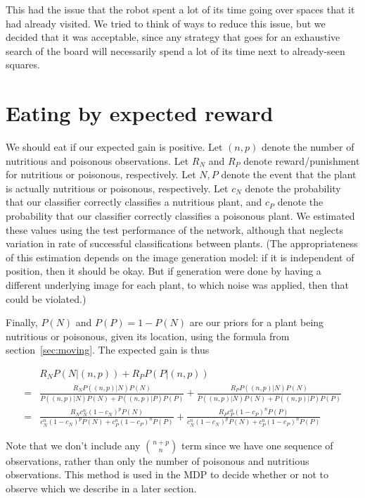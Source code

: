 \documentclass{article}
\begin{document}
This had the issue that the robot spent a lot of its time going over
spaces that it had already visited. We tried to think of ways to
reduce this issue, but we decided that it was acceptable, since any
strategy that goes for an exhaustive search of the board will
necessarily spend a lot of its time next to already-seen squares.

\section{Eating by expected reward}
\label{sec:eating}
We should eat if our expected gain is positive. Let $(n,p)$ denote the
number of nutritious and poisonous observations. Let $R_N$ and $R_P$
denote reward/punishment for nutritious or poisonous,
respectively. Let $N,P$ denote the event that the plant is actually
nutritious or poisonous, respectively. Let $c_N$ denote the
probability that our classifier correctly classifies a nutritious
plant, and $c_P$ denote the probability that our classifier correctly
classifies a poisonous plant. We estimated these values using the test
performance of the network, although that neglects variation in rate
of successful classifications between plants. (The appropriateness of
this estimation depends on the image generation model: if it is
independent of position, then it should be okay. But if generation
were done by having a different underlying image for each plant, to
which noise was applied, then that could be violated.)

Finally, $P(N)$ and $P(P)=1-P(N)$ are our priors for a plant being
nutritious or poisonous, given its location, using the formula from
section~\ref{sec:moving}. The expected gain is thus

\begin{align*}
  &R_N P(N|(n,p)) +R_P  P(P|(n,p))\\
  =&\frac{R_NP((n,p)|N) P(N)}{P((n,p)|N)P(N)+P((n,p)|P)P(P)} + \frac{R_PP((n,p)|N)P(N)}{P((n,p)|N)P(N)+P((n,p)|P)P(P)}\\
  =&\frac{R_Nc_N^n(1-c_N)^p P(N)}{ c_N^n(1-c_N)^p P(N) +  c_P^n(1-c_P)^n P(P)} + \frac{R_P c_P^n(1-c_P)^n P(P) }{ c_N^n(1-c_N)^p P(N)+c_P^n(1-c_P)^n P(P)}
\end{align*}

Note that we don't include any ${n+p\choose n}$ term since we have one
sequence of observations, rather than only the number of poisonous and
nutritious observations.  This method is used in the MDP to decide
whether or not to observe which we describe in a later section.
\end{document}
